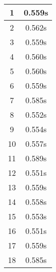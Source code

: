 \documentclass[11pt]{article}
\begin{document}
\begin{table}[!h]
\begin{center}
\begin{minipage}{0.48\textwidth}
\begin{tabular}{| c | c |}
				1 & 0.559s \\ \hline
				2 & 0.562s \\ \hline
				3 & 0.559s \\ \hline
				4 & 0.560s \\ \hline
				5 & 0.560s \\ \hline
				6 & 0.559s \\ \hline
				7 & 0.585s \\ \hline
				8 & 0.552s \\ \hline
				9 & 0.554s \\ \hline
				10 & 0.557s \\ \hline
				11 & 0.589s \\ \hline
				12 & 0.551s \\ \hline
				13 & 0.559s \\ \hline
				14 & 0.558s \\ \hline
				15 & 0.553s \\ \hline
				16 & 0.551s \\ \hline
				17 & 0.559s \\ \hline
				18 & 0.585s \\ \hline
			\end{tabular}
		\end{minipage}
	\end{center}
\end{table}

\pagebreak
%
%
%
%
%
%
\end{document}
